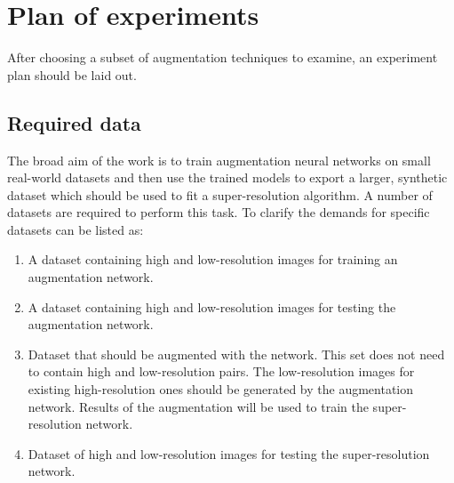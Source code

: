 \section{Plan of experiments}
After choosing a subset of augmentation techniques to examine, an experiment plan should be laid out.

\subsection{Required data}
The broad aim of the work is to train augmentation neural networks on small real-world datasets and then use the trained models to export a larger, synthetic dataset which should be used to fit a super-resolution algorithm.
A number of datasets are required to perform this task.
To clarify the demands for specific datasets can be listed as:
\begin{enumerate}
	\item A dataset containing high and low-resolution images for training an augmentation network.
	\item A dataset containing high and low-resolution images for testing the augmentation network.
	\item Dataset that should be augmented with the network.
	      This set does not need to contain high and low-resolution pairs.
	      The low-resolution images for existing high-resolution ones should be generated by the augmentation network.
	      Results of the augmentation will be used to train the super-resolution network.
	 \item Dataset of high and low-resolution images for testing the super-resolution network.
\end{enumerate}

